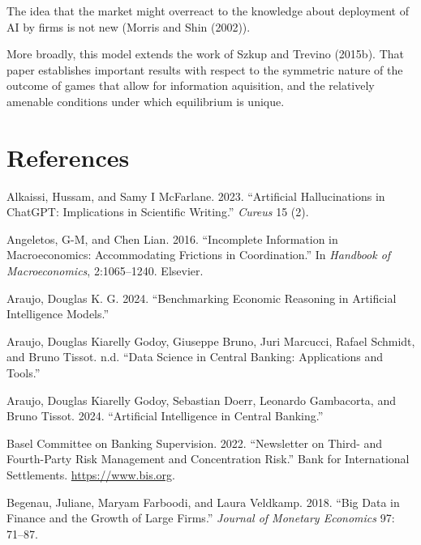 \documentclass[
]{article}
\newlength{\cslhangindent}
\newenvironment{CSLReferences}[2] %
 {\begin{list}{}{%
  \setlength{\itemindent}{0pt}
  \setlength{\leftmargin}{0pt}
  \setlength{\parsep}{0pt}
  \ifodd #1
   \setlength{\leftmargin}{\cslhangindent}
   \setlength{\itemindent}{-1\cslhangindent}
  \fi
  \setlength{\itemsep}{#2\baselineskip}}}
 {\end{list}}
\theoremstyle{plain}
\theoremstyle{remark}
\begin{document}
The idea that the market might overreact to the knowledge about
deployment of AI by firms is not new (Morris and Shin (2002)).

More broadly, this model extends the work of Szkup and Trevino (2015b).
That paper establishes important results with respect to the symmetric
nature of the outcome of games that allow for information aquisition,
and the relatively amenable conditions under which equilibrium is
unique.

\section*{References}\label{references}

\label{refs}
\begin{CSLReferences}{1}{0}
Alkaissi, Hussam, and Samy I McFarlane. 2023. {``Artificial
Hallucinations in ChatGPT: Implications in Scientific Writing.''}
\emph{Cureus} 15 (2).

Angeletos, G-M, and Chen Lian. 2016. {``Incomplete Information in
Macroeconomics: Accommodating Frictions in Coordination.''} In
\emph{Handbook of Macroeconomics}, 2:1065--1240. Elsevier.

Araujo, Douglas K. G. 2024. {``Benchmarking Economic Reasoning in
Artificial Intelligence Models.''}

Araujo, Douglas Kiarelly Godoy, Giuseppe Bruno, Juri Marcucci, Rafael
Schmidt, and Bruno Tissot. n.d. {``Data Science in Central Banking:
Applications and Tools.''}

Araujo, Douglas Kiarelly Godoy, Sebastian Doerr, Leonardo Gambacorta,
and Bruno Tissot. 2024. {``Artificial Intelligence in Central
Banking.''}

Basel Committee on Banking Supervision. 2022. {``{Newsletter on Third-
and Fourth-Party Risk Management and Concentration Risk}.''} {Bank for
International Settlements}. \url{https://www.bis.org}.

Begenau, Juliane, Maryam Farboodi, and Laura Veldkamp. 2018. {``Big Data
in Finance and the Growth of Large Firms.''} \emph{Journal of Monetary
Economics} 97: 71--87.


\end{CSLReferences}
\end{document}
